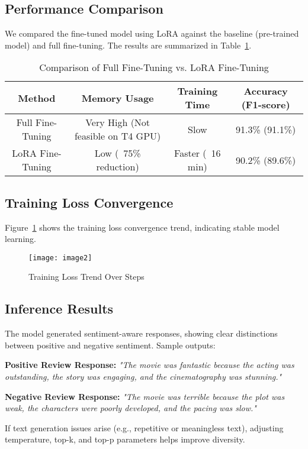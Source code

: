\documentclass{article} %
\begin{document}
\begin{flushleft}
\subsection{Performance Comparison}
We compared the fine-tuned model using LoRA against the baseline (pre-trained model) and full fine-tuning. The results are summarized in Table~\ref{tab:comparison}.

\begin{table}[h]
\centering
\begin{tabular}{|c|c|c|c|}
\hline
\textbf{Method} & \textbf{Memory Usage} & \textbf{Training Time} & \textbf{Accuracy (F1-score)} \\
\hline
Full Fine-Tuning & Very High (Not feasible on T4 GPU) & Slow & 91.3\% (91.1\%) \\
LoRA Fine-Tuning & Low (~75\% reduction) & Faster (~16 min) & 90.2\% (89.6\%) \\
\hline
\end{tabular}
\caption{Comparison of Full Fine-Tuning vs. LoRA Fine-Tuning}
\label{tab:comparison}
\end{table}

\subsection{Training Loss Convergence}
Figure~\ref{fig:loss_curve} shows the training loss convergence trend, indicating stable model learning.

\begin{figure}[h]
\centering
\texttt{[image: image2]}
\caption{Training Loss Trend Over Steps}
\label{fig:loss_curve}
\end{figure}

\subsection{Inference Results}
The model generated sentiment-aware responses, showing clear distinctions between positive and negative sentiment. Sample outputs:

\textbf{Positive Review Response:}  
\textit{"The movie was fantastic because the acting was outstanding, the story was engaging, and the cinematography was stunning."}  

\textbf{Negative Review Response:}  
\textit{"The movie was terrible because the plot was weak, the characters were poorly developed, and the pacing was slow."}

If text generation issues arise (e.g., repetitive or meaningless text), adjusting temperature, top-k, and top-p parameters helps improve diversity.


\end{flushleft}
\end{document}

